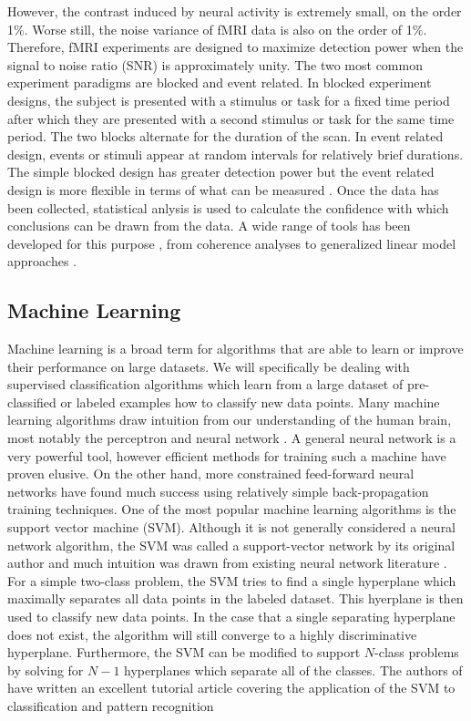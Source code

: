 \documentclass[12pt]{article}
\begin{document}
However, the contrast induced by neural activity is extremely small, on the order 1\%.
Worse still, the noise variance of fMRI data is also on the order of 1\%.
Therefore, fMRI experiments are designed to maximize detection power when the signal to noise ratio (SNR) is approximately unity.
The two most common experiment paradigms are blocked and event related.
In blocked experiment designs, the subject is presented with a stimulus or task for a fixed time period after which they are presented with a second stimulus or task for the same time period.
The two blocks alternate for the duration of the scan.
In event related design, events or stimuli appear at random intervals for relatively brief durations.
The simple blocked design has greater detection power but the event related design is more flexible in terms of what can be measured \cite{Dale1997,Liu2001}.
Once the data has been collected, statistical anlysis is used to calculate the confidence with which conclusions can be drawn from the data.
A wide range of tools has been developed for this purpose \cite{Bandettini1993}, from coherence analyses to generalized linear model approaches \cite{Worsley1995,Beckmann2003}.

\subsection{Machine Learning}
Machine learning is a broad term for algorithms that are able to learn or improve their performance on large datasets.
We will specifically be dealing with supervised classification algorithms which learn from a large dataset of pre-classified or labeled examples how to classify new data points.
Many machine learning algorithms draw intuition from our understanding of the human brain, most notably the perceptron and neural network \cite{Hecht-nielsen1989,Jain1996}.
A general neural network is a very powerful tool, however efficient methods for training such a machine have proven elusive.
On the other hand, more constrained feed-forward neural networks have found much success using relatively simple back-propagation training techniques.
One of the most popular machine learning algorithms is the support vector machine (SVM).
Although it is not generally considered a neural network algorithm, the SVM was called a support-vector network by its original author and much intuition was drawn from existing neural network literature \cite{Cortes1995}.
For a simple two-class problem, the SVM tries to find a single hyperplane which maximally separates all data points in the labeled dataset.
This hyerplane is then used to classify new data points.
In the case that a single separating hyperplane does not exist, the algorithm will still converge to a highly discriminative hyperplane.
Furthermore, the SVM can be modified to support $N$-class problems by solving for $N-1$ hyperplanes which separate all of the classes.
The authors of \cite{Burges1998} have written an excellent tutorial article covering the application of the SVM to classification and pattern recognition
\end{document}
